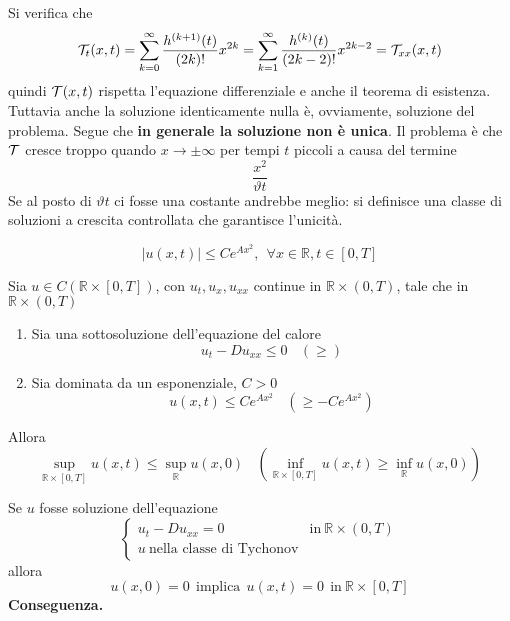 \documentclass[10pt,a4paper,twoside,openright]{book}
\begin{document}
Si verifica che
\begin{equation*}
\mathcal{T} _{t}(x,t) =\sum\limits ^{\infty }_{k=0}\frac{h^{(k+1)}(t)}{(2k) !} x^{2k} =\sum\limits ^{\infty }_{k=1}\frac{h^{(k)}(t)}{(2k-2) !} x^{2k-2} =\mathcal{T} _{xx}(x,t)
\end{equation*} %
quindi $\mathcal{T} (x,t)$ rispetta l'equazione differenziale e anche il teorema di esistenza. Tuttavia anche la soluzione identicamente nulla è, ovviamente, soluzione del problema. Segue che \textbf{in generale la soluzione non è unica}. Il problema è che $\mathcal{T} $ cresce troppo quando $x\rightarrow \pm \infty $ per tempi $t$ piccoli a causa del termine
\begin{equation*}
\frac{x^{2}}{\vartheta t}
\end{equation*}
Se al posto di $\vartheta t$ ci fosse una costante andrebbe meglio: si definisce una classe di soluzioni a crescita controllata che garantisce l'unicità.
\begin{definition}
\begin{equation*}
| u(x,t)| \leqslant Ce^{Ax^{2}},\ \ \forall x\in \mathbb{R},t\in [ 0,T]
\end{equation*}
\end{definition}
\begin{theorem}
 Sia $u\in C(\mathbb{R} \times [ 0,T])$, con $u_{t},u_{x},u_{xx}$ continue in $\mathbb{R} \times (0,T)$, tale che in $\mathbb{R} \times (0,T)$
\begin{enumerate}
\item Sia una sottosoluzione dell'equazione del calore\begin{equation*}
u_{t} -Du_{xx} \leqslant 0\ \ \ \ (\geqslant)
\end{equation*}
\item Sia dominata da un esponenziale, $C >0$\begin{equation*}
u(x,t) \leqslant Ce^{Ax^{2}} \ \ \ \ \left( \geqslant -Ce^{Ax^{2}}\right)
\end{equation*}
\end{enumerate}
Allora
\begin{equation*}
\sup _{\mathbb{R} \times [ 0,T]} u(x,t) \leqslant \sup _{\mathbb{R}} u(x,0) \ \ \ \ (\inf_{\mathbb{R} \times [ 0,T]} u(x,t) \geqslant \inf_{\mathbb{R}} u(x,0))
\end{equation*}
\end{theorem}

Se $u$ fosse soluzione dell'equazione
\begin{equation*}
\begin{cases}
u_{t} -Du_{xx} =0 & \text{in} \ \mathbb{R} \times (0,T)\\
u\ \text{nella classe di Tychonov} & 
\end{cases}
\end{equation*}
allora
\begin{equation*}
u(x,0) =0\ \ \text{implica} \ \ u(x,t) =0\ \ \text{in} \ \mathbb{R} \times [ 0,T]
\end{equation*}
\textbf{Conseguenza.}
\end{document}
